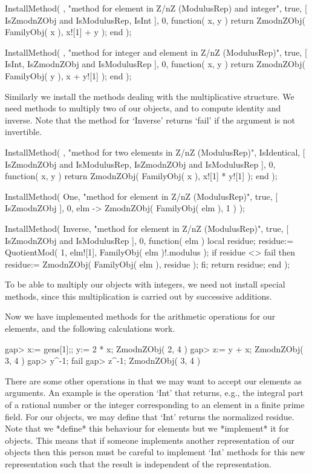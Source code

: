 \begintt
    InstallMethod( \+,
        "method for element in Z/nZ (ModulusRep) and integer",
        true,
        [ IsZmodnZObj and IsModulusRep, IsInt ], 0,
        function( x, y )
        return ZmodnZObj( FamilyObj( x ), x![1] + y );
        end );

    InstallMethod( \+,
        "method for integer and element in Z/nZ (ModulusRep)",
        true,
        [ IsInt, IsZmodnZObj and IsModulusRep ], 0,
        function( x, y )
        return ZmodnZObj( FamilyObj( y ), x + y![1] );
        end );
\endtt

Similarly we install the methods dealing with the multiplicative
structure.
We need methods to multiply two of our objects,
and to compute identity and inverse.
Note that the method for `Inverse' returns `fail' if the argument
is not invertible.

\begintt
    InstallMethod( \*,
        "method for two elements in Z/nZ (ModulusRep)",
        IsIdentical,
        [ IsZmodnZObj and IsModulusRep, IsZmodnZObj and IsModulusRep ],
        0,
        function( x, y )
        return ZmodnZObj( FamilyObj( x ), x![1] * y![1] );
        end );

    InstallMethod( One,
        "method for element in Z/nZ (ModulusRep)",
        true,
        [ IsZmodnZObj ], 0,
        elm -> ZmodnZObj( FamilyObj( elm ), 1 ) );

    InstallMethod( Inverse,
        "method for element in Z/nZ (ModulusRep)",
        true,
        [ IsZmodnZObj and IsModulusRep ], 0,
        function( elm )
        local residue;
        residue:= QuotientMod( 1, elm![1], FamilyObj( elm )!.modulus );
        if residue <> fail then
          residue:= ZmodnZObj( FamilyObj( elm ), residue );
        fi;
        return residue;
        end );
\endtt

To be able to multiply our objects with integers,
we need not install special methods,
since this multiplication is carried out by successive additions.

Now we have implemented methods for the arithmetic operations for our
elements, and the following calculations work.

\begintt
    gap> x:= gens[1];; y:= 2 * x;
    ZmodnZObj( 2, 4 )
    gap> z:= y + x;
    ZmodnZObj( 3, 4 )
    gap> y^-1;
    fail
    gap> z^-1;
    ZmodnZObj( 3, 4 )
\endtt

There are some other operations in {\GAP} that we may want to accept
our elements as arguments.
An example is the operation `Int' that returns, e.g.,
the integral part of a rational number or the integer corresponding to
an element in a finite prime field.
For our objects, we may define that `Int' returns the normalized residue.
Note that we *define* this behaviour for elements
but we *implement* it for objects.
This means that if someone implements another representation of our
objects then this person must be careful to implement `Int' methods for
this new representation such that the result is independent of the
representation.

